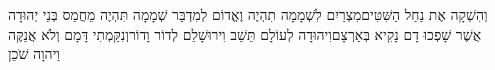 \documentclass[../main/main.tex]{subfiles}
\begin{document}
\begin{multicols*}{\ncols}
וְהִשְׁקָה אֶת נַחַל הַשִּׁטִּים\PreVerseSpace{}מִצְרַיִם לִשְׁמָמָה תִהְיֶה וֶאֱדוֹם לְמִדְבַּר שְׁמָמָה תִּהְיֶה מֵחֲמַס בְּנֵי יְהוּדָה אֲשֶׁר שָׁפְכוּ דָם נָקִיא בְּאַרְצָם\PreVerseSpace{}וִיהוּדָה לְעוֹלָם תֵּשֵׁב וִירוּשָׁלֵם לְדוֹר וָדוֹר\PreVerseSpace{}וְנִקַּמְתִי\SubEnd{} דָּמָם וְלֹא אֲנַקֶּה\SubEnd{} וַיהוָה שֹׁכֵן\par
\end{multicols*}
\end{document}
